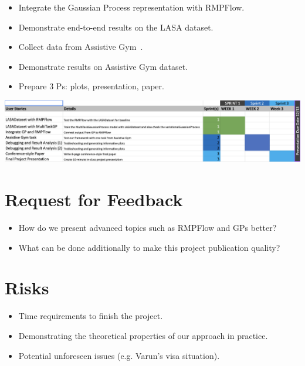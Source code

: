 \documentclass{article}
\begin{document}

\begin{itemize}
    \item Integrate the Gaussian Process representation with RMPFlow.
    \item Demonstrate end-to-end results on the LASA dataset.
    \item Collect data from Assistive Gym~\cite{Erickson20icra}.
    \item Demonstrate results on Assistive Gym dataset.
    \item Prepare 3 Ps: plots, presentation, paper.
\end{itemize}

\includegraphics[width=\textwidth,bb=0 0 1000 220]{images/gantt_chart.png}


\section{Request for Feedback}

\begin{itemize}
    \item How do we present advanced topics such as RMPFlow and GPs better?
    \item What can be done additionally to make this project publication quality?
\end{itemize}

\section{Risks}
\begin{itemize}
    \item Time requirements to finish the project.
    \item Demonstrating the theoretical properties of our approach in practice.
    \item Potential unforeseen issues (e.g. Varun's visa situation).
\end{itemize}
\end{document}
